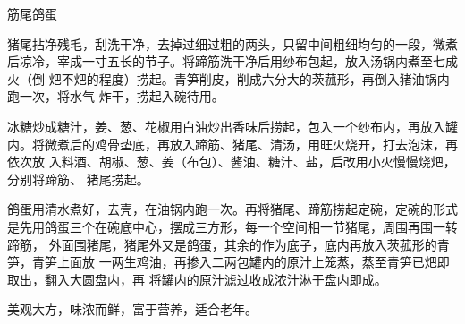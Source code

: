 \begin{recipe}[筋鞭鸽蛋]{筋尾鸽蛋}

\ingredients


\preparation

\step 猪尾拈净残毛，刮洗干净，去掉过细过粗的两头，只留中间粗细均匀的一段，微煮
后凉冷，宰成一寸五长的节子。将蹄筋洗干净后用纱布包起，放入汤锅内煮至七成火（倒
𤆵不𤆵的程度）捞起。青笋削皮，削成六分大的茨菰形，再倒入猪油锅内跑一次，将水气
炸干，捞起入碗待用。

\step 冰糖炒成糖汁，姜、葱、花椒用白油炒出香味后捞起，包入一个纱布内，再放入罐
内。将微煮后的鸡骨垫底，再放入蹄筋、猪尾、清汤，用旺火烧开，打去泡沫，再依次放
入料酒、胡椒、葱、姜（布包）、酱油、糖汁、盐，后改用小火慢慢烧𤆵，分别将蹄筋、
猪尾捞起。

\step 鸽蛋用清水煮好，去壳，在油锅内跑一次。再将猪尾、蹄筋捞起定碗，定碗的形式
是先用鸽蛋三个在碗底中心，摆成三方形，每一个空间相一节猪尾，周围再围一转蹄筋，
外面围猪尾，猪尾外又是鸽蛋，其余的作为底子，底内再放入茨菰形的青笋，青笋上面放
一两生鸡油，再掺入二两包罐内的原汁上笼蒸，蒸至青笋已𤆵即取出，翻入大圆盘内，再
将罐内的原汁滤过收成浓汁淋于盘内即成。

\features

美观大方，味浓而鲜，富于营养，适合老年。

\end{recipe}

